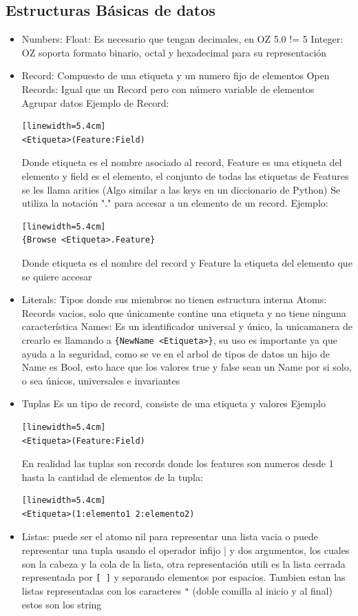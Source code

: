 \documentclass[10pt,journal,compsoc]{IEEEtran}
\begin{document}
\subsection{Estructuras B\'asicas de datos}
\begin{itemize}
	\item Numbers:
		\subitem Float: Es necesario que tengan decimales, en OZ 5.0 != 5
		\subitem Integer: OZ soporta formato binario, octal y hexadecimal para su representaci\'on
	\item Record: Compuesto de una etiqueta y un numero fijo de elementos
		\subitem Open Records: Igual que un Record pero con n\'umero variable de elementos 
		\subitem Agrupar datos
		\subitem Ejemplo de Record:
\begin{lstlisting}[language=Oz, caption = {Record}][linewidth=5.4cm]
<Etiqueta>(Feature:Field)
\end{lstlisting}
		Donde etiqueta es el nombre asociado al record, Feature es una etiqueta del elemento y field es el elemento, el conjunto de todas las etiquetas de Features se les llama arities (Algo similar a las keys en un diccionario de Python) 
		\subitem Se utiliza la notaci\'on "." para accesar a un elemento de un record. Ejemplo:
\begin{lstlisting}[language=Oz, caption = {Accesar al elemento de un Record}][linewidth=5.4cm]
{Browse <Etiqueta>.Feature}
\end{lstlisting}
		Donde etiqueta es el nombre del record y Feature la etiqueta del elemento que se quiere accesar
	\item Literals: Tipos donde sus miembros no tienen estructura interna
		\subitem *Atoms: Records vacios, solo que \'unicamente contine una etiqueta y no tiene ninguna caracter\'istica
		\subitem *Names: Es un identificador universal y \'unico, la unicamanera de crearlo es llamando a \verb|{NewName <Etiqueta>}|, su uso es importante ya que ayuda a la seguridad, como se ve en el arbol de tipos de datos un hijo de Name es Bool, esto hace que los valores true y false sean un Name por si solo, o sea \'unicos, universales e invariantes
	\item Tuplas
		\subitem Es un tipo de record, consiste de una etiqueta y valores
		\subitem Ejemplo
\begin{lstlisting}[language=Oz, caption = {Tupla}][linewidth=5.4cm]
<Etiqueta>(Feature:Field)
\end{lstlisting}
		\subitem En realidad las tuplas son records donde los features son numeros desde 1 hasta la cantidad de elementos de la tupla:
\begin{lstlisting}[language=Oz, caption = {Tupla}][linewidth=5.4cm]
<Etiqueta>(1:elemento1 2:elemento2)
\end{lstlisting}
	\item Listas: puede ser el atomo nil para representar una lista vacia o puede representar una tupla usando el operador infijo $\mid$ y dos argumentos, los cuales son la cabeza y la cola de la lista, otra representaci\'on utili es la lista cerrada representada por \verb|[ ]| y separando elementos por espacios. Tambien estan las listas representadas con los caracteres \verb|"| (doble comilla al inicio y al final) estos son los string
\end{itemize}
\end{document}
